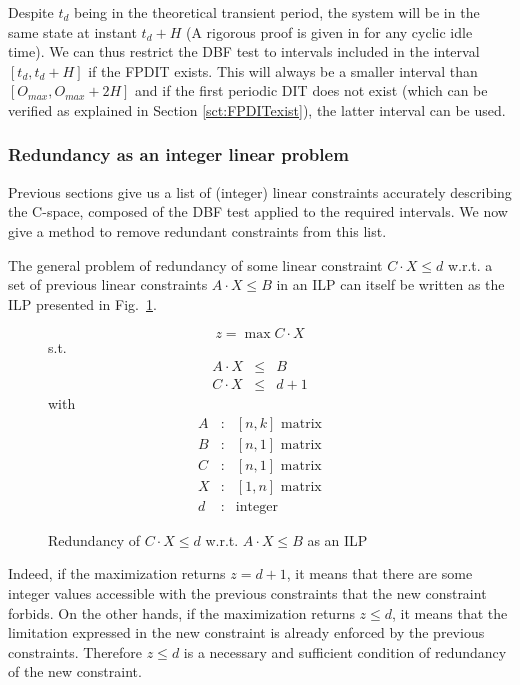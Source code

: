 \documentclass[conference]{IEEEtran}
\begin{document}
Despite $t_d$ being in the theoretical transient period, the system will be in the same state at instant $t_d + H$ (A rigorous proof is given in \cite{choquet2004minimal} for any cyclic idle time). We can thus restrict the DBF test to intervals included in the interval $[t_d, t_d + H]$ if the FPDIT exists. This will always be a smaller interval than $[O_{max}, O_{max} + 2H]$ and if the first periodic DIT does not exist (which can be verified as explained in Section \ref{sct:FPDITexist}), the latter interval can be used.

\subsubsection{Redundancy as an integer linear problem}

Previous sections give us a list of (integer) linear constraints accurately describing the C-space, composed of the DBF test applied to the required intervals. We now give a method to remove redundant constraints from this list.

The general problem of redundancy of some linear constraint $C \cdot X \leq d$
w.r.t. a set of previous linear constraints $A \cdot X \leq B$ in an ILP can
itself be written as the ILP presented in Fig.~\ref{fig:redILP}.

\begin{figure}[h]
$$z = \max C \cdot X$$
s.t.
\[
\begin{array}{rcc}
  A \cdot X &\leq & B \\
  C \cdot X &\leq & d + 1
\end{array}
\]
with
\[
  \begin{array}{ccc}
    A & : & [n,k] \text{ matrix}\\
    B & : & [n,1] \text{ matrix}\\
    C & : & [n,1] \text{ matrix}\\
    X & : & [1,n] \text{ matrix}\\
    d & : & \text{integer}
  \end{array}
\]
\caption{Redundancy of $C \cdot X \leq d$ w.r.t. $A \cdot X \leq B$ as an ILP}
\label{fig:redILP}
\end{figure}

Indeed, if the maximization returns $z=d+1$, it means that there are some integer values accessible with the previous constraints that the new constraint forbids. On the other hands, if the maximization returns $z \leq d$, it means that the limitation expressed in the new constraint is already enforced by the previous constraints. Therefore $z \leq d$ is a necessary and sufficient condition of redundancy of the new constraint.
\end{document}

